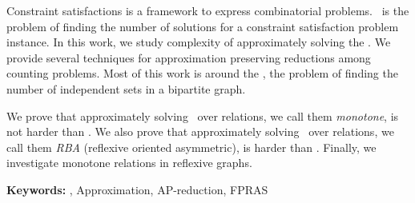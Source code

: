 
%
%

Constraint satisfactions is a framework to express combinatorial problems.
\ccsp\ is the problem of finding the number of solutions for a constraint satisfaction problem
instance. In this work, we study complexity of approximately solving the \ccsp\@. We
provide several techniques for approximation preserving reductions
among counting problems. Most of this work is around the \cbis,
the problem of finding the number of independent sets in a bipartite graph.

We prove that approximately solving \ccsp\ over relations, we call them \emph{monotone},
is not harder than \cbis\@. We also prove that approximately
solving \ccsp\ over relations, we call them \emph{RBA} (reflexive oriented asymmetric), is harder than \cbis\@.
Finally, we investigate monotone relations in reflexive graphs.

\vspace{1cm}

\noindent \textbf{Keywords:} \ccsp, Approximation, AP-reduction, FPRAS







